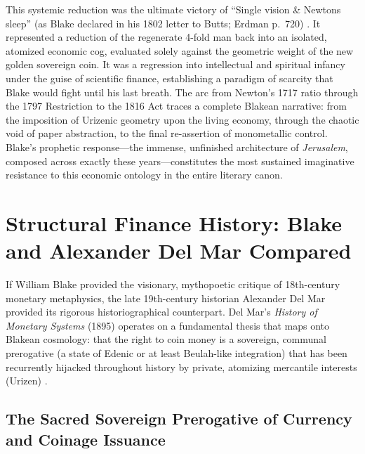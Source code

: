\documentclass[
]{article}
\begin{document}
This systemic reduction was the ultimate victory of ``Single vision \&
Newtons sleep'' (as Blake declared in his 1802 letter to Butts; Erdman
p.~720) \citep{erdman1988complete}. It represented a reduction of the
regenerate 4-fold man back into an isolated, atomized economic cog,
evaluated solely against the geometric weight of the new golden
sovereign coin. It was a regression into intellectual and spiritual
infancy under the guise of scientific finance, establishing a paradigm
of scarcity that Blake would fight until his last breath. The arc from
Newton's 1717 ratio through the 1797 Restriction to the 1816 Act traces
a complete Blakean narrative: from the imposition of Urizenic geometry
upon the living economy, through the chaotic void of paper abstraction,
to the final re-assertion of monometallic control. Blake's prophetic
response---the immense, unfinished architecture of \emph{Jerusalem},
composed across exactly these years---constitutes the most sustained
imaginative resistance to this economic ontology in the entire literary
canon.

\newpage

\section{Structural Finance History: Blake and Alexander Del Mar
Compared}\label{structural-finance-history-blake-and-alexander-del-mar-compared}

If William Blake provided the visionary, mythopoetic critique of
18th-century monetary metaphysics, the late 19th-century historian
Alexander Del Mar provided its rigorous historiographical counterpart.
Del Mar's \emph{History of Monetary Systems} (1895) operates on a
fundamental thesis that maps onto Blakean cosmology: that the right to
coin money is a sovereign, communal prerogative (a state of Edenic or at
least Beulah-like integration) that has been recurrently hijacked
throughout history by private, atomizing mercantile interests (Urizen)
\citep{delmar1895history}.

\subsection{The Sacred Sovereign Prerogative of Currency and Coinage
Issuance}\label{the-sacred-sovereign-prerogative-of-currency-and-coinage-issuance}
\end{document}
